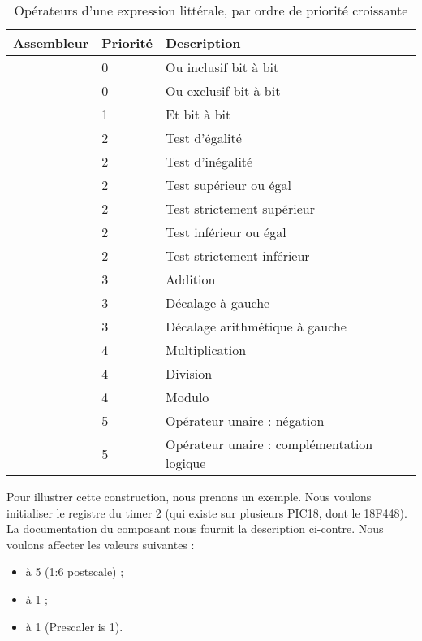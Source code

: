 \begin{table}[!ht]
  \centering
  \begin{tabular}{lll}
    \textbf{Assembleur} & \textbf{Priorité} & \textbf{Description}\\
    \hline
    \piccolo{|} & 0 & Ou inclusif bit à bit \\
    \hdashline
    \piccolo{\^} & 0 & Ou exclusif bit à bit \\
    \hdashline
    \piccolo{\&} & 1 & Et bit à bit \\
    \hdashline
    \piccolo{==} & 2 & Test d'égalité \\
    \hdashline
    \piccolo{\!=} & 2 & Test d'inégalité \\
    \hdashline
    \piccolo{>=} & 2 & Test supérieur ou égal \\
    \hdashline
    \piccolo{>} & 2 & Test strictement supérieur \\
    \hdashline
    \piccolo{<=} & 2 & Test inférieur ou égal \\
    \hdashline
    \piccolo{<} & 2 & Test strictement inférieur \\
    \hdashline
    \piccolo{+} & 3 & Addition \\
    \hdashline
    \piccolo{<<} & 3 & Décalage à gauche \\
    \hdashline
    \piccolo{>>} & 3 & Décalage arithmétique à gauche \\
    \hdashline
    \piccolo{*} & 4 & Multiplication \\
    \hdashline
    \piccolo{/} & 4 & Division \\
    \hdashline
    \piccolo{\%} & 4 & Modulo \\
    \hdashline
    \piccolo{-} & 5 & Opérateur unaire : négation \\
    \hdashline
    \piccolo{\~} & 5 & Opérateur unaire : complémentation logique \\
    \hline
  \end{tabular}
  \caption{Opérateurs d'une expression littérale, par ordre de priorité croissante}
\end{table}




Pour illustrer cette construction, nous prenons un exemple. Nous voulons initialiser le registre  du timer 2 (qui existe sur plusieurs PIC18, dont le 18F448). La documentation du composant nous fournit la description ci-contre. Nous voulons affecter les valeurs suivantes :\begin{itemize}
  \item {} à 5 (1:6 postscale) ;
  \item {} à 1 ;
  \item {} à 1 (Prescaler is 1).
\end{itemize}

